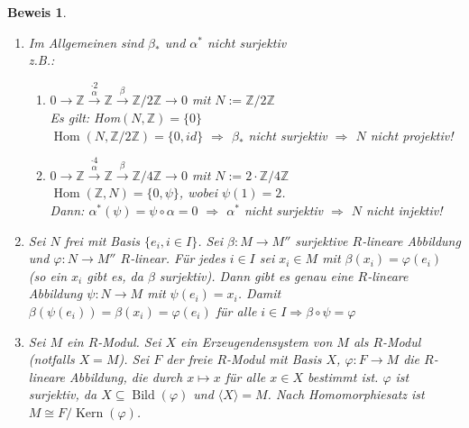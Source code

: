 \documentclass[a4paper,12pt]{scrbook}
\theoremstyle{break}
\theoremstyle{nonumberbreak}
\newtheorem{Bew}{Beweis}
\theoremstyle{nonumberplain}
\DeclareMathOperator{\Hom}{Hom}
\DeclareMathOperator{\Kern}{Kern}
\DeclareMathOperator{\Bild}{Bild}
\begin{document}
\begin{Bew}
\begin{enumerate}
    $\Kern(\alpha^*)\subseteq\Bild(\beta^*)$: Sei $\psi \in \Kern(\alpha^*)$.
    Aber $\psi \in \Hom_R(M, N)$ mit $\psi \circ \alpha=0$\\
    Weil $\psi$ auf $\Bild(\alpha)$ verschwindet, kommutiert
    \[
    \begin{xy}
      \xymatrix{
        & M'' &\\
          M \ar[rd]_{\psi} \ar[ur]^{\beta} \ar[rr] &     &  M/\Bild(\alpha)
        \ar[dl]^\sigma \ar[ul]_{\cong}\\
        &  N  & }
    \end{xy}
    \]
    $\Rightarrow \beta^*(\sigma)= \psi \Longrightarrow$ Beh.
  \item Im Allgemeinen sind $\beta_*$ und $\alpha^*$ nicht surjektiv\\
    z.B.: \begin{enumerate}
    \item[1.] $0\rightarrow \mathbb Z \stackrel{\cdot2}{\stackrel{\alpha}\rightarrow} 
      \mathbb Z \stackrel\beta\rightarrow \mathbb Z / 2\mathbb Z\rightarrow 0$ mit $N:= \mathbb Z / 2\mathbb Z$\\
      Es gilt: Hom$(N, \mathbb Z)=\{0\}$\\
      $\Hom(N, \mathbb Z/2\mathbb Z)=\{0, id\}$ $\Rightarrow$ $\beta_*$ nicht surjektiv $\Rightarrow$ $N$ nicht projektiv!
    \item[2.] $0\rightarrow \mathbb Z \stackrel{\cdot4}{\stackrel{\alpha}\rightarrow} 
      \mathbb Z \stackrel\beta\rightarrow \mathbb Z / 4\mathbb Z\rightarrow 0$ mit $N:= 2\cdot \mathbb Z / 4\mathbb Z$\\
      $\Hom(\mathbb Z, N)= \{0, \psi\}$, wobei $\psi(1)=2$.\\
      Dann: $\alpha^*(\psi)=\psi\circ \alpha = 0$ $\Rightarrow$ $\alpha^*$ nicht surjektiv $\Rightarrow$ $N$ nicht injektiv!
    \end{enumerate}
  \item Sei $N$ frei mit Basis $\{e_i,i \in I\}$.
    Sei $\beta: M \to M''$ surjektive $R$-lineare Abbildung und
    $\varphi: N \to M''$ $R$-linear. Für jedes $i \in I$ sei $x_i \in M$
    mit $\beta(x_i) = \varphi(e_i)$ (so ein $x_i$ gibt es, da $\beta$
    surjektiv). Dann gibt es genau eine $R$-lineare Abbildung $\psi: N
    \to M$ mit $\psi(e_i) = x_i$. Damit $\beta(\psi(e_i)) = \beta(x_i) =
    \varphi(e_i)$ für alle $i \in I \Rightarrow \beta \circ \psi =
    \varphi$
  \item \label{1.5fBew}
    Sei $M$ ein $R$-Modul. Sei $X$ ein Erzeugendensystem von $M$ als
    $R$-Modul (notfalls $X = M$). Sei $F$ der freie $R$-Modul mit Basis
    $X$, $\varphi: F \to M$ die $R$-lineare Abbildung, die durch $x
    \mapsto x$ für alle $x \in X$ bestimmt ist. $\varphi$ ist surjektiv,
    da $X \subseteq \Bild(\varphi)$ und $\langle X \rangle = M$.
    Nach Homomorphiesatz ist $M \cong F/\Kern(\varphi)$.
  \end{enumerate}
\end{Bew}
\end{document}
